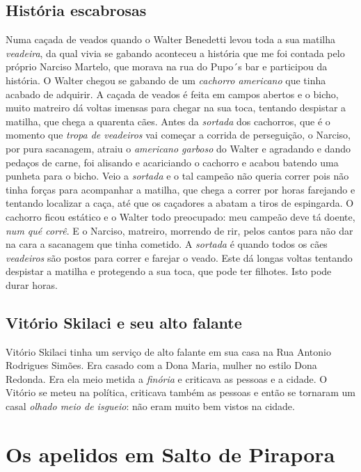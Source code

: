 \documentclass[12pt,brazil,]{book}
\begin{document}
\subsection{História escabrosas}\label{histuxf3ria-escabrosas}

Numa caçada de veados quando o Walter Benedetti levou toda a sua matilha
\emph{veadeira}, da qual vivia se gabando aconteceu a história que me
foi contada pelo próprio Narciso Martelo, que morava na rua do Pupo´s
bar e participou da história. O Walter chegou se gabando de um
\emph{cachorro americano} que tinha acabado de adquirir. A caçada de
veados é feita em campos abertos e o bicho, muito matreiro dá voltas
imensas para chegar na sua toca, tentando despistar a matilha, que chega
a quarenta cães. Antes da \emph{sortada} dos cachorros, que é o momento
que \emph{tropa de veadeiros} vai começar a corrida de perseguição, o
Narciso, por pura sacanagem, atraiu o \emph{americano garboso} do Walter
e agradando e dando pedaços de carne, foi alisando e acariciando o
cachorro e acabou batendo uma punheta para o bicho. Veio a
\emph{sortada} e o tal campeão não queria correr pois não tinha forças
para acompanhar a matilha, que chega a correr por horas farejando e
tentando localizar a caça, até que os caçadores a abatam a tiros de
espingarda. O cachorro ficou estático e o Walter todo preocupado: meu
campeão deve tá doente, \emph{num qué corrê}. E o Narciso, matreiro,
morrendo de rir, pelos cantos para não dar na cara a sacanagem que tinha
cometido. A \emph{sortada} é quando todos os cães \emph{veadeiros} são
postos para correr e farejar o veado. Este dá longas voltas tentando
despistar a matilha e protegendo a sua toca, que pode ter filhotes. Isto
pode durar horas.

\subsection{Vitório Skilaci e seu alto
falante}\label{vituxf3rio-skilaci-e-seu-alto-falante}

Vitório Skilaci tinha um serviço de alto falante em sua casa na Rua
Antonio Rodrigues Simões. Era casado com a Dona Maria, mulher no estilo
Dona Redonda. Era ela meio metida a \emph{finória} e criticava as
pessoas e a cidade. O Vitório se meteu na política, criticava também as
pessoas e então se tornaram um casal \emph{olhado meio de isgueio}: não
eram muito bem vistos na cidade.

\section{Os apelidos em Salto de
Pirapora}\label{os-apelidos-em-salto-de-pirapora}
\end{document}
